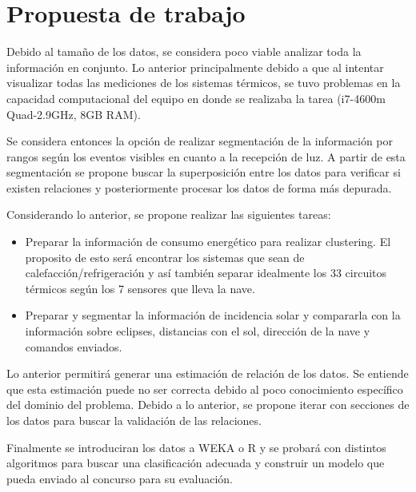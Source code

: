 \documentclass[../Main.tex]{subfiles}
\begin{document}
\section{Propuesta de trabajo}
Debido al tamaño de los datos, se considera poco viable analizar toda la información en conjunto. Lo anterior principalmente debido a que al intentar visualizar todas las mediciones de los sistemas térmicos, se tuvo problemas en la capacidad computacional del equipo en donde se realizaba la tarea (i7-4600m Quad-2.9GHz, 8GB RAM).
\newline \par
Se considera entonces la opción de realizar segmentación de la información por rangos según los eventos visibles en cuanto a la recepción de luz. A partir de esta segmentación se propone buscar la superposición entre los datos para verificar si existen relaciones y posteriormente procesar los datos de forma más depurada.
\newline \par
Considerando lo anterior, se propone realizar las siguientes tareas:
\begin{itemize}
	\item Preparar la información de consumo energético para realizar clustering. El proposito de esto será encontrar los sistemas que sean de calefacción/refrigeración y así también separar idealmente los 33 circuitos térmicos según los 7 sensores que lleva la nave.
    \item Preparar y segmentar la información de incidencia solar y compararla con la información sobre eclipses, distancias con el sol, dirección de la nave y comandos enviados.
\end{itemize}

Lo anterior permitirá generar una estimación de relación de los datos. Se entiende que esta estimación puede no ser correcta debido al poco conocimiento específico del dominio del problema. Debido a lo anterior, se propone iterar con secciones de los datos para buscar la validación de las relaciones.
\newline \par
Finalmente se introduciran los datos a WEKA o R y se probará con distintos algoritmos para buscar una clasificación adecuada y construir un modelo que pueda enviado al concurso para su evaluación.
\end{document}

